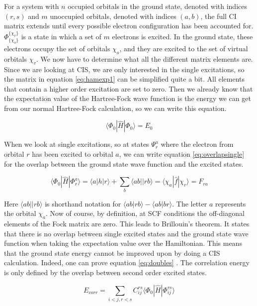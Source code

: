 For a system with $n$ occupied orbitals in the ground state, denoted with indices $(r, s)$ and $m$ unoccupied orbitals, denoted with indices $(a,b)$, the full CI matrix extends until
every possible electron configuration has been accounted for. $\Phi_{\{\chi_o\}}^{\{\chi_v\}}$ is a state in which a set of $m$ electrons is excited. In the ground state, these
electrons occupy the set of orbitals {$\chi_o$}, and they are excited to the set of virtual orbitals {$\chi_v$}.
We now have to determine what all the different matrix elements are. Since we are looking at CIS, we are only interested in the single excitations, so the matrix in equation
\eqref{eq:hamexp1} can be simplified quite a bit. All elements that contain a higher order excitation are set to zero. Then we already know that the expectation value of the Hartree-Fock wave function is the energy we can get from our normal
Hartree-Fock calculation, so we can write this equation.

\begin{equation}\label{eq:E0}
  \langle \Phi_0 | \hat{H} | \Phi_0 \rangle = E_0
\end{equation}

When we look at single excitations, so at states $\Psi_r^a$ where the electron from orbital $r$ has been excited to orbital $a$, we can write equation
\eqref{eq:overlapsingle} \cite{Szabo1996} for the overlap between the ground state wave function and the excited states.

\begin{equation}\label{eq:overlapsingle}
  \langle\Phi_0 |\hat{H}|\Phi_r^a\rangle = \langle a|h|r \rangle + \sum_b \langle ab||rb \rangle = \langle \chi_a |\hat{f}| \chi_r \rangle = F_{ra}
\end{equation}

Here $\langle ab||rb \rangle$ is shorthand notation for $\langle ab | rb \rangle - \langle ab | br \rangle$. The letter $a$ represents the orbital $\chi_a$.
Now of course, by definition, at SCF conditions the off-diagonal elements of the Fock matrix are zero. This leads to Brillouin's theorem. It states that there is no overlap
between single excited states and the ground state wave function when taking the expectation value over the Hamiltonian. This means that the ground state energy cannot be improved
upon by doing a CIS calculation. Indeed, one can prove equation \eqref{eq:doubles} \cite{Szabo1996}. The correlation energy is only defined by the overlap between second order
excited states.

\begin{equation}\label{eq:doubles}
  E_{corr} = \sum_{i<j, r<s} C_{ij}^{rs}\langle \Phi_{0} |\hat{H}|\Phi_{ij}^{rs}\rangle
\end{equation}

